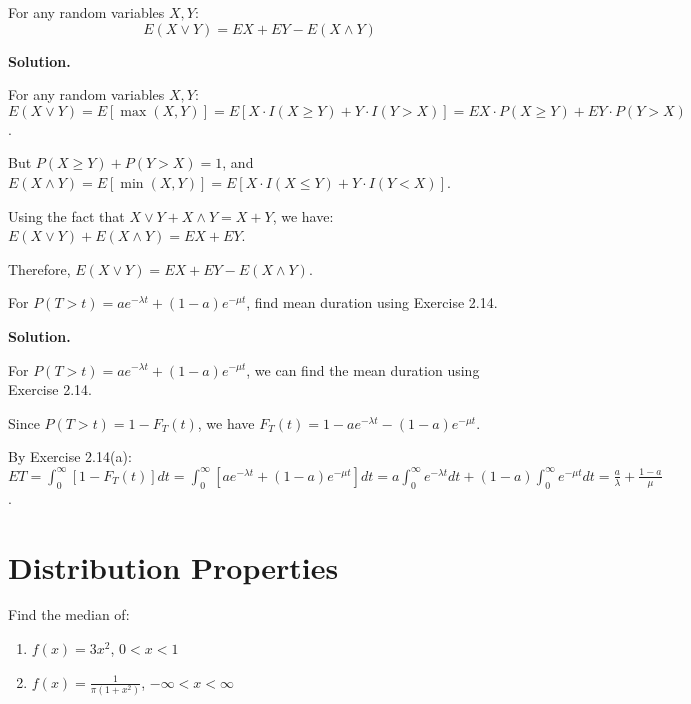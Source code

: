 \begin{problembox}
For any random variables $X,Y$:
\[ E(X\lor Y) = EX + EY - E(X\land Y) \]
\end{problembox}

\noindent\textbf{Solution.}

For any random variables $X,Y$:
$E(X\lor Y) = E[\max(X,Y)] = E[X \cdot I(X \geq Y) + Y \cdot I(Y > X)] = EX \cdot P(X \geq Y) + EY \cdot P(Y > X)$.

But $P(X \geq Y) + P(Y > X) = 1$, and $E(X\land Y) = E[\min(X,Y)] = E[X \cdot I(X \leq Y) + Y \cdot I(Y < X)]$.

Using the fact that $X\lor Y + X\land Y = X + Y$, we have:
$E(X\lor Y) + E(X\land Y) = EX + EY$.

Therefore, $E(X\lor Y) = EX + EY - E(X\land Y)$.

\begin{problembox}
For $P(T>t) = ae^{-\lambda t} + (1-a)e^{-\mu t}$, find mean duration using Exercise 2.14.
\end{problembox}

\noindent\textbf{Solution.}

For $P(T>t) = ae^{-\lambda t} + (1-a)e^{-\mu t}$, we can find the mean duration using Exercise 2.14.

Since $P(T>t) = 1 - F_T(t)$, we have $F_T(t) = 1 - ae^{-\lambda t} - (1-a)e^{-\mu t}$.

By Exercise 2.14(a): $ET = \int_0^\infty [1-F_T(t)]dt = \int_0^\infty [ae^{-\lambda t} + (1-a)e^{-\mu t}]dt = a\int_0^\infty e^{-\lambda t}dt + (1-a)\int_0^\infty e^{-\mu t}dt = \frac{a}{\lambda} + \frac{1-a}{\mu}$.

\section{Distribution Properties}

\begin{problembox}
Find the median of:
\begin{enumerate}[label=(\alph*)]
    \item $f(x)=3x^2$, $0<x<1$
    \item $f(x)=\frac{1}{\pi(1+x^2)}$, $-\infty<x<\infty$
\end{enumerate}
\end{problembox}

